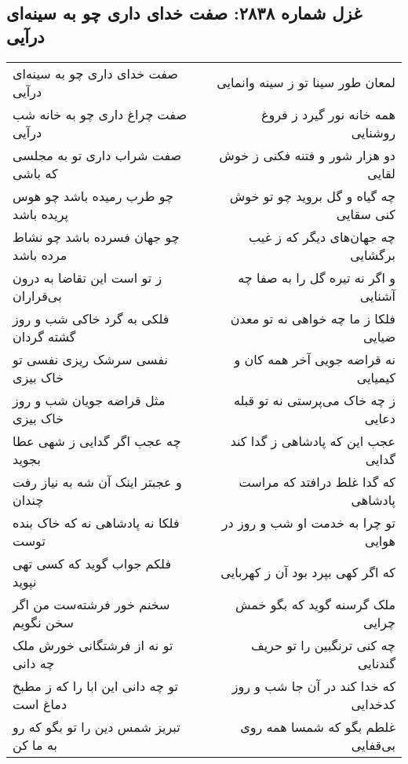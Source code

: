 \begin{center}
\section*{غزل شماره ۲۸۳۸: صفت خدای داری چو به سینه‌ای درآیی}
\label{sec:2838}
\begin{longtable}{l p{0.5cm} r}
صفت خدای داری چو به سینه‌ای درآیی
&&
لمعان طور سینا تو ز سینه وانمایی
\\
صفت چراغ داری چو به خانه شب درآیی
&&
همه خانه نور گیرد ز فروغ روشنایی
\\
صفت شراب داری تو به مجلسی که باشی
&&
دو هزار شور و فتنه فکنی ز خوش لقایی
\\
چو طرب رمیده باشد چو هوس پریده باشد
&&
چه گیاه و گل بروید چو تو خوش کنی سقایی
\\
چو جهان فسرده باشد چو نشاط مرده باشد
&&
چه جهان‌های دیگر که ز غیب برگشایی
\\
ز تو است این تقاضا به درون بی‌قراران
&&
و اگر نه تیره گل را به صفا چه آشنایی
\\
فلکی به گرد خاکی شب و روز گشته گردان
&&
فلکا ز ما چه خواهی نه تو معدن ضیایی
\\
نفسی سرشک ریزی نفسی تو خاک بیزی
&&
نه قراضه جویی آخر همه کان و کیمیایی
\\
مثل قراضه جویان شب و روز خاک بیزی
&&
ز چه خاک می‌پرستی نه تو قبله دعایی
\\
چه عجب اگر گدایی ز شهی عطا بجوید
&&
عجب این که پادشاهی ز گدا کند گدایی
\\
و عجبتر اینک آن شه به نیاز رفت چندان
&&
که گدا غلط درافتد که مراست پادشاهی
\\
فلکا نه پادشاهی نه که خاک بنده توست
&&
تو چرا به خدمت او شب و روز در هوایی
\\
فلکم جواب گوید که کسی تهی نپوید
&&
که اگر کهی بپرد بود آن ز کهربایی
\\
سخنم خور فرشته‌ست من اگر سخن نگویم
&&
ملک گرسنه گوید که بگو خمش چرایی
\\
تو نه از فرشتگانی خورش ملک چه دانی
&&
چه کنی ترنگبین را تو حریف گندنایی
\\
تو چه دانی این ابا را که ز مطبخ دماغ است
&&
که خدا کند در آن جا شب و روز کدخدایی
\\
تبریز شمس دین را تو بگو که رو به ما کن
&&
غلطم بگو که شمسا همه روی بی‌قفایی
\\
\end{longtable}
\end{center}

